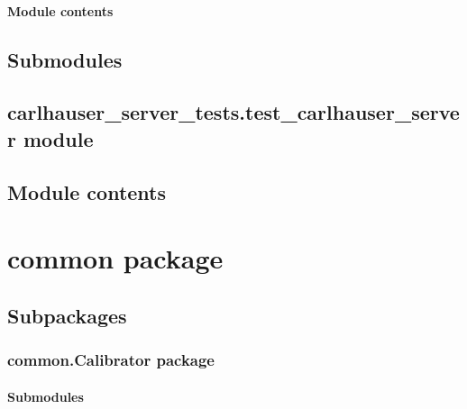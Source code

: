\documentclass[letterpaper,10pt,english]{sphinxmanual}
\begin{document}
\subsubsection{Module contents}
\label{\detokenize{carlhauser_server_tests.Singletons:module-carlhauser_server_tests.Singletons}}\label{\detokenize{carlhauser_server_tests.Singletons:module-contents}}

\section{Submodules}
\label{\detokenize{carlhauser_server_tests:submodules}}

\section{carlhauser\_server\_tests.test\_carlhauser\_server module}
\label{\detokenize{carlhauser_server_tests:carlhauser-server-tests-test-carlhauser-server-module}}

\section{Module contents}
\label{\detokenize{carlhauser_server_tests:module-carlhauser_server_tests}}\label{\detokenize{carlhauser_server_tests:module-contents}}

\chapter{common package}
\label{\detokenize{common:common-package}}\label{\detokenize{common::doc}}

\section{Subpackages}
\label{\detokenize{common:subpackages}}

\subsection{common.Calibrator package}
\label{\detokenize{common.Calibrator:common-calibrator-package}}\label{\detokenize{common.Calibrator::doc}}

\subsubsection{Submodules}
\label{\detokenize{common.Calibrator:submodules}}
\end{document}
